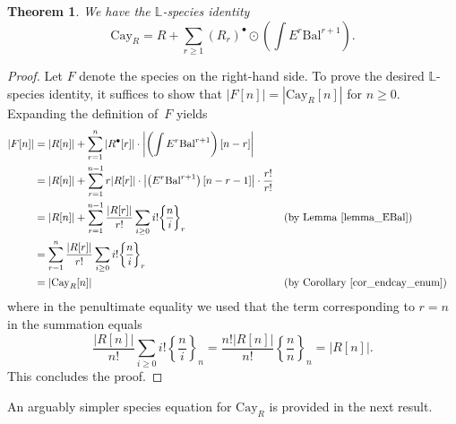 \documentclass[a4paper,11pt,UKenglish]{article}
\newcommand{\LL}{\mathbb{L}}
\newcommand{\Set}{E}
\newcommand{\Bal}{\mathrm{Bal}}
\newcommand{\Cay}{\mathrm{Cay}}
\newcommand{\sdiff}[3]{\genfrac{\{}{\}}{}{}{{#1}}{{#2}}_{{#3}}}
\newtheorem{theorem}{Theorem}[section]
\theoremstyle{definition}
\begin{document}
\begin{theorem}\label{thm_uniPsiR}
We have the $\LL$-species identity
\[
  \Cay_{R} = R + \sum_{r\ge 1}
  (R_r)^{\bullet}\odot\left(\int\Set^r\Bal^{r+1}\right). %
\]
\end{theorem}
\begin{proof}
Let $F$ denote the species on the right-hand side.
To prove the desired $\LL$-species identity, it suffices to show
that $|F[n]|=|\Cay_{R}[n]|$ for $n\ge 0$.
Expanding the definition of~$F$ yields
\begin{align*}
|F[n]|
&= |R[n]| + \sum_{r=1}^n
|R^{\bullet}[r]|\cdot
\left|\left(\int \Set^r\Bal^{r+1}\right)[n-r]\right|\\
&= |R[n]| + \sum_{r=1}^{n-1}
r|R[r]|\cdot
\left|\left(\Set^r\Bal^{r+1}\right)[n-r-1]\right|\cdot\frac{r!}{r!}\\
&= |R[n]| + \sum_{r=1}^{n-1}\frac{|R[r]|}{r!}\sum_{i\ge 0}i!\sdiff{n}{i}{r}
&& \text{(by Lemma~\ref{lemma_EBal})}\\
&= \sum_{r=1}^{n}\frac{|R[r]|}{r!}\sum_{i\ge 0}i!\sdiff{n}{i}{r} \\
&=|\Cay_{R}[n]|
&& \text{(by Corollary~\ref{cor_endcay_enum})}
\end{align*}
where in the penultimate equality we used that the term corresponding to $r=n$ in
the summation equals
$$
\frac{|R[n]|}{n!}\sum_{i\ge 0}i!\sdiff{n}{i}{n}
= \frac{n!|R[n]|}{n!}\sdiff{n}{n}{n} = |R[n]|.
$$
This concludes the proof.
\end{proof}

An arguably simpler species equation for $\Cay_R$ is
provided in the next result.
\end{document}
